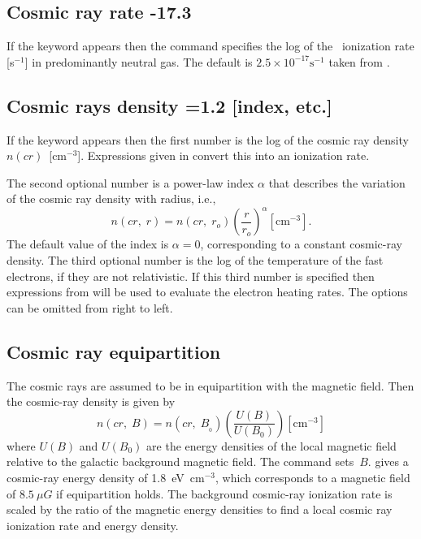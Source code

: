\subsection{Cosmic ray rate -17.3}

If the keyword  appears then the command specifies
the log of the
\hO\ ionization rate [s$^{-1}$] in predominantly neutral gas.
The default is
$2.5\times 10^{-17} \mathrm{s}^{-1}$ taken from \citet{Williams1998}.

\subsection{Cosmic rays density =1.2 [index, etc.]}

If the keyword  appears then the first number
is the log of the
cosmic ray density $n(cr)$~[cm$^{-3}$].
Expressions given in \citet{FerlandMushotzky1984} convert this into an ionization rate.

The second optional number is a power-law index $\alpha $ that
describes the
variation of the cosmic ray density with radius, i.e.,
\begin{equation}
n\left( {cr,\;r} \right) = n\left( {cr,\;r_o } \right)\left( {\frac{r}{{r_o
}}} \right)^\alpha
 [\mathrm{cm}^{-3}]  .
\end{equation}
The default value of the index is  $\alpha =0$,
corresponding to a constant cosmic-ray density.
The third optional number is the log of the temperature of
the fast electrons, if they are not relativistic.
If this third number
is specified then expressions from \citet{Balbus1982} will be used
to evaluate the electron heating rates.
The options can be omitted from right to left.

\subsection{Cosmic ray equipartition}

The cosmic rays are assumed to be in equipartition with the magnetic
field.
Then the cosmic-ray density is given by
\begin{equation}
n\left( {cr,\;B} \right) = n\left( {cr,\;B_{_0 } } \right)\left(
{\frac{{U\left( B \right)}}{{U\left( {B_0 } \right)}}} \right)
[\mathrm{cm}^{-3}]%
\end{equation}
where $U(B)$ and $U(B_0)$ are the energy densities of the local
magnetic field
relative to the galactic background magnetic field.
The 
command sets~$B$.  \citet{Webber1998} gives a cosmic-ray
energy density of 1.8~eV~cm$^{-3}$,
which corresponds to a magnetic field of
$8.5~\mu G$ if equipartition holds.
The background cosmic-ray ionization rate
is scaled by the ratio of the magnetic energy densities to find a local
cosmic ray ionization rate and energy density.

